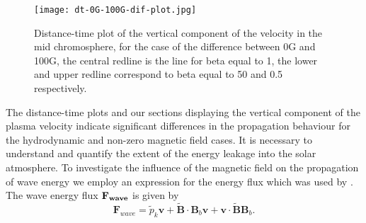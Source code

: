 \documentclass[linenumbers]{aastex63}
\begin{document}



\begin{figure}
\centering
\label{td_vert_dif_bv0G_100G_300}
\texttt{[image: dt-0G-100G-dif-plot.jpg]}
\caption{Distance-time plot of the vertical component of the velocity in the mid chromosphere, for the case of the difference between 0G and 100G, the central redline is the line for beta  equal to 1, the lower and upper redline correspond to beta equal to 50 and 0.5 respectively.}
\end{figure}

The distance-time plots and our sections displaying the vertical component of the plasma velocity indicate significant differences in the propagation behaviour for the hydrodynamic and non-zero magnetic field cases. It is necessary to understand and quantify the extent of the energy leakage into the solar atmosphere. To investigate the influence of the magnetic field on the propagation of wave energy we employ an expression for the energy flux which was used by \citet{Bogdan2003}. The wave energy flux $\bf{F}_{wave}$ is given by
$$
{\mathbf F}_{wave}=\tilde{p}_{k} {\mathbf v}+\tilde{\mathbf B}\cdot {\mathbf B_{b}}{\mathbf v}+{\mathbf v}\cdot \tilde{\mathbf B}{\mathbf B_{b}} .
$$
\end{document}
